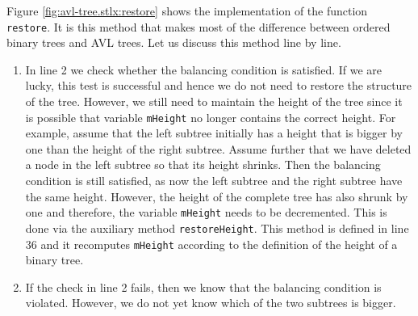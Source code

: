 Figure \ref{fig:avl-tree.stlx:restore} shows the implementation of the function \texttt{restore}.
It is this method that makes most of the difference between ordered binary trees and AVL trees.  Let
us discuss this method line by line.
\begin{enumerate}
\item In line 2 we check whether the balancing condition is satisfied.  If we are lucky,  this test 
      is successful and hence we do not need to restore the structure of the tree.  However, we
      still need to maintain the height of the tree since it is possible that variable
      \texttt{mHeight} no longer contains the correct height.  For example, assume that the left subtree
      initially has a height that is bigger by one than the height of the right subtree.  Assume
      further that we have deleted a node in the left subtree so that its height shrinks.  Then the
      balancing condition is still satisfied, as now the left subtree and the right subtree have the
      same height.  However, the height of the complete tree has also shrunk by one and therefore, 
      the variable \texttt{mHeight} needs to be decremented.  This is done via the auxiliary method
      \texttt{restoreHeight}.  This method is defined in line 36 and it recomputes \texttt{mHeight}
      according to the definition of the height of a binary tree.
\item If the check in line 2 fails, then we know that the balancing condition is violated.
      However, we do not yet know which of the two subtrees is bigger.  


\end{enumerate}
